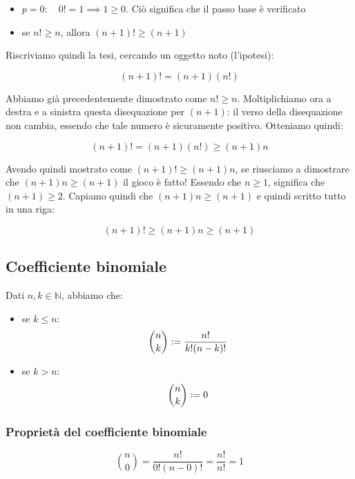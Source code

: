 \documentclass{article}
\begin{document}
\begin{itemize}
    \item $p = 0: \quad 0! = 1 \implies 1 \geq 0$. Ciò significa che il passo base è verificato
    \item se $n! \geq n$, allora $(n+1)! \geq (n+1)$
\end{itemize}

\noindent Riscriviamo quindi la tesi, cercando un oggetto noto (l'ipotesi):

\begin{equation*}
    (n+1)! = (n+1)(n!)
\end{equation*}

\noindent Abbiamo già precedentemente dimostrato come $n! \geq n$. Moltiplichiamo ora a destra e a sinistra questa disequazione per $(n+1)$: il verso della disequazione non cambia, essendo che tale numero è sicuramente positivo. Otteniamo quindi:

\begin{equation*}
    (n+1)! = (n+1)(n!) \geq (n+1)n
\end{equation*}

\noindent Avendo quindi mostrato come $(n+1)! \geq (n+1)n$, se riusciamo a dimostrare che $(n+1)n \geq (n+1)$ il gioco è fatto! Essendo che $n \geq 1$, significa che $(n+1) \geq 2$. Capiamo quindi che $(n+1)n \geq (n+1)$ e quindi scritto tutto in una riga:

\begin{equation*}
    (n+1)! \geq (n+1)n \geq (n+1)
\end{equation*}

\subsection{Coefficiente binomiale}
Dati $n, k \in \mathbb{N}$, abbiamo che:

\begin{itemize}
    \item se $k \leq n$: $$\binom{n}{k} \vcentcolon = \dfrac{n!}{k!(n-k)!}$$
    \item se $k > n$: $$\binom{n}{k} \vcentcolon = 0$$
\end{itemize}

\subsubsection{Proprietà del coefficiente binomiale}
\begin{equation*}
    \binom{n}{0} = \frac{n!}{0!(n - 0)!} = \frac{n!}{n!} = 1
\end{equation*}
\end{document}
